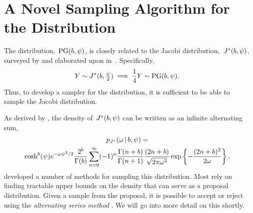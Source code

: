 \section{A Novel Sampling Algorithm for the \polyagamma Distribution}
\label{sec:pgsampling}

The \polyagamma distribution,~$\mathrm{PG}(b,\psi)$, is closely related 
to the Jacobi distribution,~$J^{*}(b,\psi)$, surveyed by \citet{biane2001probability} and 
elaborated upon in~\citet{windle2014sampling}.
Specifically, 
\begin{align*}
  Y \sim J^{*}(b, \tfrac{\psi}{2}) \implies
  \frac{1}{4} Y \sim \mathrm{PG}(b, \psi).
\end{align*}
Thus, to develop a sampler for the \polyagamma distribution, 
it is sufficient to be able to sample the Jacobi distribution.

As derived by \citet{windle2014sampling}, the density
of~$J^{*}(b,\psi)$ can be written as an infinite alternating
sum,
\begin{multline}
  \label{eq:jacobi_density}
  p_{J^{*}}({\omega} \,|\, b, \psi) = \\ 
  \cosh^b(\psi) e^{-{\omega} \psi^2/2} \frac{2^b}{\Gamma(b)} 
  \sum_{n=0}^\infty (-1)^n \frac{\Gamma(n+b)}{\Gamma(n+1)} \frac{(2n+b)}{\sqrt{2\pi {\omega}^3}}
  \exp\left\{- \frac{(2n+b)^2}{2{\omega}} \right\}.
\end{multline}
\citet{windle2014sampling} developed a number of methods for sampling
this distribution. Most rely on finding tractable upper bounds on the density
that can serve as a proposal distribution. Given a sample from the proposal,
it is possible to accept or reject using the \emph{alternating series method} \citep{devroye1986}. We will go into more detail on this shortly.

